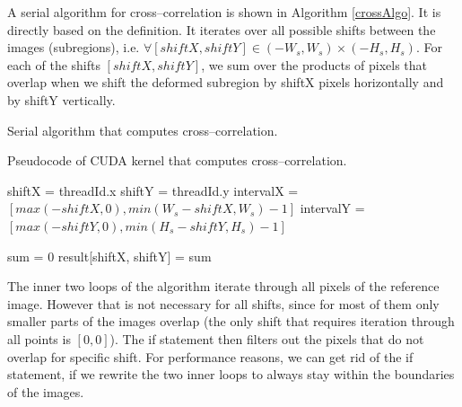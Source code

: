 A serial algorithm for cross--correlation is shown in Algorithm \ref{crossAlgo}. It is directly based on the definition. It iterates over all possible shifts between the images (subregions), i.e. $\forall [shiftX, shiftY] \in (-W_s, W_s) \times (-H_s, H_s)$. For each of the shifts $[shiftX, shiftY]$, we sum over the products of pixels that overlap when we shift the deformed subregion by shiftX pixels horizontally and by shiftY vertically.


\begin{algorithm}
	\caption{Serial algorithm that computes cross--correlation.}
	\label{crossAlgo}
	\vspace{5px}
	
\end{algorithm}

\begin{algorithm}
	\caption{Pseudocode of CUDA kernel that computes cross--correlation.}
	\label{crossKernel}
	
	shiftX = threadId.x\;
	shiftY = threadId.y\;
	intervalX = $[max(-shiftX, 0), min(W_s - shiftX, W_s) - 1]$\;
	intervalY = $[max(-shiftY, 0), min(H_s - shiftY, H_s) - 1]$\;
	
	sum = 0\;
	result[shiftX, shiftY] = sum\;
	
\end{algorithm}

The inner two loops of the algorithm iterate through all pixels of the reference image. However that is not necessary for all shifts, since for most of them only smaller parts of the images overlap (the only shift that requires iteration through all points is $[0,0]$). The if statement then filters out the pixels that do not overlap for specific shift. For performance reasons, we can get rid of the if statement, if we rewrite the two inner loops to always stay within the boundaries of the images.

